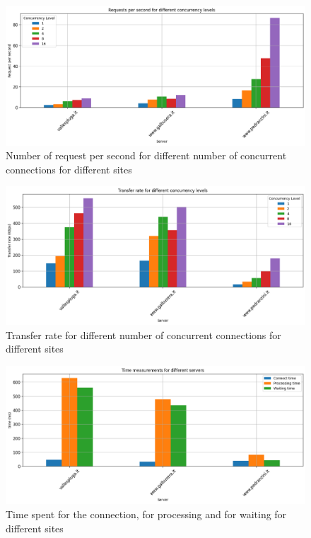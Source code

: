\documentclass[eng]{class}
\begin{document}
\begin{figure}[H]
	\centering
	\includegraphics[width=\columnwidth]{images/Request_per_second_diff_conc.png}
	\caption{Number of request per second for different number of concurrent connections for different sites}
	\label{fig-3}
\end{figure}
\begin{figure}[H]
	\centering
	\includegraphics[width=\columnwidth]{images/transf_diff_conc.png}
	\caption{Transfer rate for different number of concurrent connections for different sites}
	\label{fig-4}
\end{figure}

\begin{figure}[H]
	\centering
	\includegraphics[width=\columnwidth]{images/time_diff_server.png}
	\caption{Time spent for the connection, for processing and for waiting for different sites}
	\label{fig-5}
\end{figure}
\end{document}
